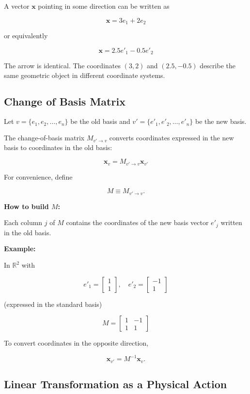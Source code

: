 A vector $\mathbf{x}$ pointing in some direction can be written as

\[
\mathbf{x} = 3e_1 + 2e_2
\]

or equivalently

\[
\mathbf{x} = 2.5e'_1 - 0.5e'_2
\]

The arrow is identical. The coordinates $(3,2)$ and $(2.5,-0.5)$
describe the same geometric object in different coordinate systems.

\subsection{Change of Basis Matrix}
\label{sec:change-of-basis}

Let $v = \{e_1, e_2, \ldots, e_n\}$ be the old basis and
$v' = \{e'_1, e'_2, \ldots, e'_n\}$ be the new basis.

The change-of-basis matrix
$
M_{v' \to v}
$
converts coordinates expressed in the new basis to coordinates in the
old basis:

\[
\mathbf{x}_v = M_{v' \to v}\mathbf{x}_{v'}
\]

For convenience, define

\[
M \equiv M_{v' \to v}.
\]

\textbf{How to build $M$:}

Each column $j$ of $M$ contains the coordinates of the new basis vector
$e'_j$ written in the old basis.

\textbf{Example:}

In $\mathbb{R}^2$ with

\[
e'_1 =
\begin{bmatrix}
1\\1
\end{bmatrix},
\quad
e'_2 =
\begin{bmatrix}
-1\\1
\end{bmatrix}
\]

(expressed in the standard basis)

\[
M =
\begin{bmatrix}
1 & -1 \\
1 & 1
\end{bmatrix}
\]

To convert coordinates in the opposite direction,

\[
\mathbf{x}_{v'} = M^{-1}\mathbf{x}_v.
\]

\subsection{Linear Transformation as a Physical Action}
\label{sec:linear-transformation}

